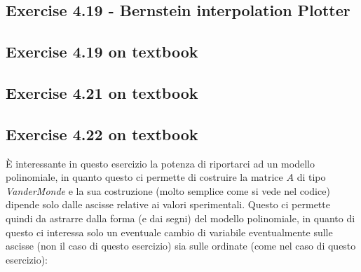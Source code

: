 \subsection{Exercise 4.19 - Bernstein interpolation Plotter}
\label{subsec:exercise419BernsteinInterpolationPlotter}


\subsection{Exercise 4.19 on textbook}
\label{subsec:exercise419}


\subsection{Exercise 4.21 on textbook}
\label{subsec:exercise421}


\subsection{Exercise 4.22 on textbook}
\label{subsec:exercise422}
\`E interessante in questo esercizio la potenza di riportarci ad un modello
polinomiale, in quanto questo ci permette di costruire la matrice $A$ di tipo
\emph{VanderMonde} e la sua costruzione (molto semplice come si vede nel
codice) dipende solo dalle ascisse relative ai valori sperimentali. Questo ci
permette quindi da astrarre dalla forma (e dai segni) del modello polinomiale,
in quanto di questo ci interessa solo un eventuale cambio di variabile
eventualmente sulle ascisse (non il caso di questo esercizio) sia sulle ordinate
(come nel caso di questo esercizio):
